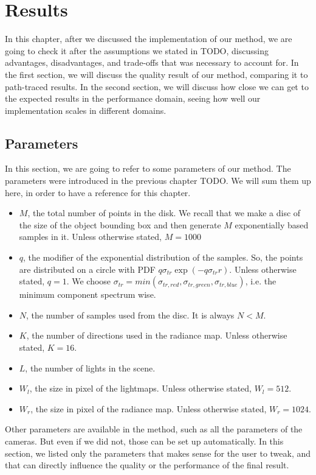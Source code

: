 \chapter{Results}

In this chapter, after we discussed the implementation of our method, we are going to check it after the assumptions we stated in TODO, discussing advantages, disadvantages, and trade-offs that was necessary to account for. In the first section, we will discuss the quality result of our method, comparing it to path-traced results. In the second section, we will discuss how close we can get to the expected results in the performance domain, seeing how well our implementation scales in different domains. 

\section{Parameters}
In this section, we are going to refer to some parameters of our method. The parameters were introduced in the previous chapter TODO. We will sum them up here, in order to have a reference for this chapter.

\begin{itemize}
\item $M$, the total number of points in the disk. We recall that we make a disc of the size of the object bounding box and then generate $M$ exponentially based samples in it. Unless otherwise stated, $M = 1000$
\item $q$, the modifier of the exponential distribution of the samples. So, the points are distributed on a circle with PDF $q \sigma_{tr}\exp(-q\sigma_{tr} r)$. Unless otherwise stated, $q = 1$. We choose $\sigma_{tr} = min(\sigma_{tr, red},\sigma_{tr, green},\sigma_{tr, blue})$, i.e. the minimum component spectrum wise.
\item $N$, the number of samples used from the disc. It is always $N < M$.
\item $K$, the number of directions used in the radiance map. Unless otherwise stated, $K = 16$. 
\item $L$, the number of lights in the scene. 
\item $W_l$, the size in pixel of the lightmaps. Unless otherwise stated, $W_l = 512$.
\item $W_r$, the size in pixel of the radiance map. Unless otherwise stated, $W_r = 1024$.
\end{itemize}


Other parameters are available in the method, such as all the parameters of the cameras. But even if we did not, those can be set up automatically. In this section, we listed only the parameters that makes sense for the user to tweak, and that can directly influence the quality or the performance of the final result.

